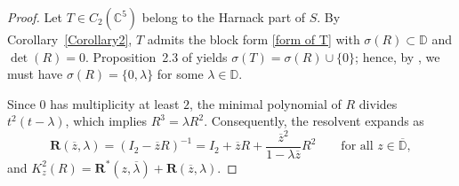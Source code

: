 \documentclass[12pt, reqno]{amsart}
\theoremstyle{definition}
\theoremstyle{remark}
\numberwithin{equation}{section}
\begin{document}
\begin{proof}
	Let $T \in C_2(\mathbb{C}^5)$ belong to the Harnack part of $S$. By Corollary~\ref{Corollary2}, $T$ admits the block form \eqref{form of T} with $\sigma(R)\subset \mathbb{D}$ and $\det(R)=0$. Proposition~2.3 of \cite{CaNaBe2024} yields $\sigma(T)= \sigma(R) \cup \{ 0 \}$; hence, by \cite[Corollary~2.2]{CaBeBel2018}, we must have $\sigma(R)=\{ 0, \lambda \}$ for some $\lambda \in \mathbb{D}$. 
	
	Since $0$ has multiplicity at least $2$, the minimal polynomial of $R$ divides $t^2(t-\lambda)$, which implies $R^3=\lambda R^2$. Consequently, the resolvent expands as
	\[
	\mathbf{R}(\overline{z}, \lambda) = (I_2-\overline{z}R)^{-1} = I_2 + \overline{z} R + \frac{\overline{z}^2}{1-\lambda \overline{z}}R^2 \qquad \text{for all } z\in \overline{\mathbb{D}},
	\]
	and $K_z^2(R) = \mathbf{R}^*(z, \overline{\lambda}) + \mathbf{R}(\overline{z}, \lambda)$.
	

\end{proof}
\end{document}
